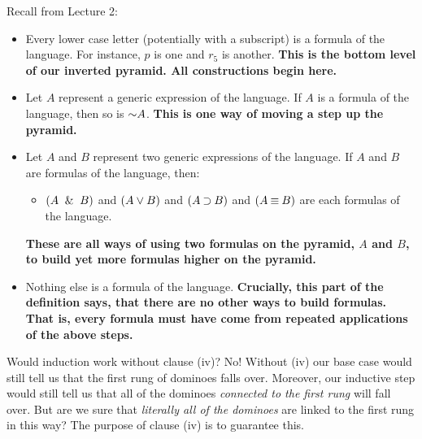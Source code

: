 \documentclass[options]{philosophersimprint}
\begin{document}
Recall from Lecture 2:
\begin{itemize}
    \item[(i)] Every lower case letter (potentially with a subscript) is a formula of the language. For instance, $p$ is one and $r_5$ is another. \textbf{This is the bottom level of our inverted pyramid. All constructions begin here.}
    \item[(ii)] Let $A$ represent a generic expression of the language. If $A$ is a formula of the language, then so is $\mathord{\sim} A$. \textbf{This is one way of moving a step up the pyramid.}
    \item[(iii)] Let $A$ and $B$ represent two generic expressions of the language. If $A$ and $B$ are formulas of the language, then:
    \begin{itemize}
        \item $(A \ \mathbin{\&} \  B)$ and $(A \mathbin{\vee} B)$ and $(A \mathbin{\supset} B)$ and $(A \mathbin{\equiv} B)$ are each formulas of the language.
    \end{itemize}
    \textbf{These are all ways of using two formulas on the pyramid, $A$ and $B$, to build yet more formulas higher on the pyramid.}
    \item[(iv)] Nothing else is a formula of the language. \textbf{Crucially, this part of the definition says, that there are no other ways to build formulas. That is, every formula must have come from repeated applications of the above steps.}
\end{itemize}
Would induction work without clause (iv)? No! Without (iv) our base case would still tell us that the first rung of dominoes falls over. Moreover, our inductive step would still tell us that all of the dominoes \textit{connected to the first rung} will fall over. But are we sure that \textit{literally all of the dominoes} are linked to the first rung in this way? The purpose of clause (iv) is to guarantee this.
\end{document}
